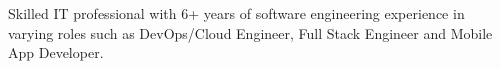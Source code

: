 \documentclass[letter,10pt]{article}
\begin{document}

Skilled IT professional with 6+ years of software engineering experience in varying roles such as DevOps/Cloud Engineer, Full Stack Engineer and Mobile App Developer. 
\end{document}
